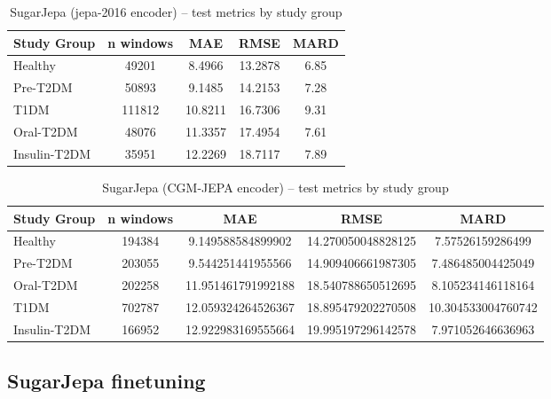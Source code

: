 \documentclass[11pt,a4paper]{article}
\begin{document}
\begin{table}[ht]
    \centering
    \begin{tabular}{lcccc}
        \hline
        Study Group & n windows & MAE & RMSE & MARD \\
        \hline
        Healthy & 49201 & 8.4966 & 13.2878 & 6.85 \\
        Pre-T2DM & 50893 & 9.1485 & 14.2153 & 7.28 \\
        T1DM & 111812 & 10.8211 & 16.7306 & 9.31 \\
        Oral-T2DM & 48076 & 11.3357 & 17.4954 & 7.61 \\
        Insulin-T2DM & 35951 & 12.2269 & 18.7117 & 7.89 \\
        \hline
    \end{tabular}
    \caption{SugarJepa (jepa-2016 encoder) -- test metrics by study group}
    \label{tab:sugar-jepa-2016-study-group-metrics}
\end{table}

\begin{table}[ht]
    \centering
    \begin{tabular}{lcccc}
        \hline
        Study Group & n windows & MAE & RMSE & MARD \\
        \hline
        Healthy & 194384 & 9.149588584899902 & 14.270050048828125 & 7.57526159286499 \\
        Pre-T2DM & 203055 & 9.544251441955566 & 14.909406661987305 & 7.486485004425049 \\
        Oral-T2DM & 202258 & 11.951461791992188 & 18.540788650512695 & 8.105234146118164 \\
        T1DM & 702787 & 12.059324264526367 & 18.895479202270508 & 10.304533004760742 \\
        Insulin-T2DM & 166952 & 12.922983169555664 & 19.995197296142578 & 7.971052646636963 \\
        \hline
    \end{tabular}
    \caption{SugarJepa (CGM-JEPA encoder) -- test metrics by study group}
    \label{tab:sugar-jepa-cgm-jepa-study-group-metrics}
\end{table}

\subsection{SugarJepa finetuning}
\end{document}

